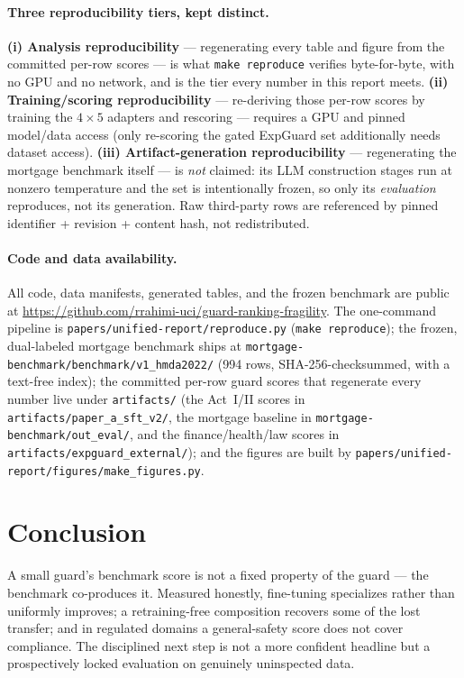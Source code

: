 \documentclass[11pt]{article}
\newcommand{\code}[1]{\texttt{\small #1}}
\begin{document}
\paragraph{Three reproducibility tiers, kept distinct.} \textbf{(i) Analysis reproducibility} --- regenerating
every table and figure from the committed per-row scores --- is what \code{make reproduce} verifies
byte-for-byte, with no GPU and no network, and is the tier every number in this report meets.
\textbf{(ii) Training/scoring reproducibility} --- re-deriving those per-row scores by training the $4\times5$
adapters and rescoring --- requires a GPU and pinned model/data access (only re-scoring the gated ExpGuard
set additionally needs dataset access). \textbf{(iii) Artifact-generation reproducibility} --- regenerating
the mortgage benchmark itself --- is \emph{not} claimed: its LLM construction stages run at nonzero
temperature and the set is intentionally frozen, so only its \emph{evaluation} reproduces, not its
generation. Raw third-party rows are referenced by pinned identifier + revision + content hash, not
redistributed.

\paragraph{Code and data availability.} \begin{sloppypar}All code, data manifests, generated tables, and
the frozen benchmark are public at \url{https://github.com/rrahimi-uci/guard-ranking-fragility}. The
one-command pipeline is \code{papers/unified-report/reproduce.py} (\code{make reproduce}); the frozen,
dual-labeled mortgage benchmark ships at \code{mortgage-benchmark/benchmark/v1\_hmda2022/} (994 rows,
SHA-256-checksummed, with a text-free index); the committed per-row guard scores that regenerate every
number live under \code{artifacts/} (the Act~I/II scores in \code{artifacts/paper\_a\_sft\_v2/}, the
mortgage baseline in \code{mortgage-benchmark/out\_eval/}, and the finance/health/law scores in
\code{artifacts/expguard\_external/}); and the figures are built by
\code{papers/unified-report/figures/make\_figures.py}.\end{sloppypar}

\section{Conclusion}
\label{sec:conclusion}
A small guard's benchmark score is not a fixed property of the guard --- the benchmark co-produces it.
Measured honestly, fine-tuning specializes rather than uniformly improves; a retraining-free composition
recovers some of the lost transfer; and in regulated domains a general-safety score does not cover
compliance. The disciplined next step is not a more
confident headline but a prospectively locked evaluation on genuinely uninspected data.
\end{document}
